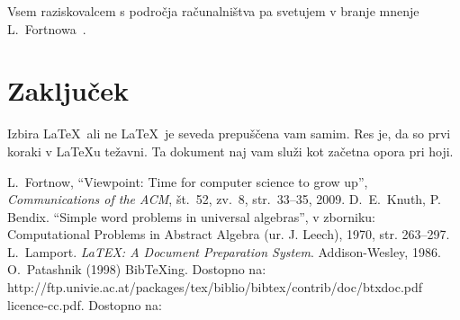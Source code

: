 \documentclass[oneside, a4paper, 12pt]{book}
\newcommand{\BibTeX}{{\sc Bib}\TeX}
\begin{document}
Vsem raziskovalcem s področja računalništva pa svetujem v branje mnenje L.\ Fortnowa~\cite{lf}.

\chapter{Zaključek}
Izbira \LaTeX\ ali ne \LaTeX\ je seveda prepuščena vam samim. Res je, da so prvi koraki v \LaTeX{}u težavni. Ta dokument naj vam služi kot začetna opora pri hoji.

\begin{thebibliography}{99}
 L.\ Fortnow, ``Viewpoint: Time for computer science to grow up'',
{\it Communications of the ACM}, št.\ 52, zv.\ 8, str.\ 33--35, 2009.
 D.\ E.\ Knuth, P. Bendix. ``Simple word problems in universal algebras'', v zborniku: Computational Problems in Abstract Algebra (ur. J. Leech), 1970, str. 263--297.
 L.\ Lamport. {\it LaTEX: A Document Preparation System}. Addison-Wesley, 1986.
 O.\ Patashnik (1998) \BibTeX{}ing. 
Dostopno na:\\ http://ftp.univie.ac.at/packages/tex/biblio/bibtex/contrib/doc/btxdoc.pdf
 licence-cc.pdf. Dostopno na: 
\end{thebibliography}
\end{document}
